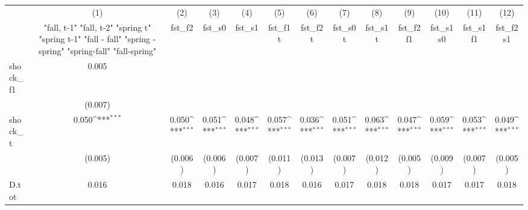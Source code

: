 {
\def\sym#1{\ifmmode^{#1}\else\(^{#1}\)\fi}
\begin{tabular}{l*{12}{c}}
\toprule
            &\multicolumn{1}{c}{(1)}&\multicolumn{1}{c}{(2)}&\multicolumn{1}{c}{(3)}&\multicolumn{1}{c}{(4)}&\multicolumn{1}{c}{(5)}&\multicolumn{1}{c}{(6)}&\multicolumn{1}{c}{(7)}&\multicolumn{1}{c}{(8)}&\multicolumn{1}{c}{(9)}&\multicolumn{1}{c}{(10)}&\multicolumn{1}{c}{(11)}&\multicolumn{1}{c}{(12)}\\
            &\multicolumn{1}{c}{  "fall, t-1" "fall, t-2" "spring t" "spring t-1"  "fall - fall" "spring - spring" "spring-fall" "fall-spring" }&\multicolumn{1}{c}{fst\_f2}&\multicolumn{1}{c}{fst\_s0}&\multicolumn{1}{c}{fst\_s1}&\multicolumn{1}{c}{fst\_f1t}&\multicolumn{1}{c}{fst\_f2t}&\multicolumn{1}{c}{fst\_s0t}&\multicolumn{1}{c}{fst\_s1t}&\multicolumn{1}{c}{fst\_f2f1}&\multicolumn{1}{c}{fst\_s1s0}&\multicolumn{1}{c}{fst\_s1f1}&\multicolumn{1}{c}{fst\_f2s1}\\
\midrule
shock\_f1    &       0.005         &                     &                     &                     &                     &                     &                     &                     &                     &                     &                     &                     \\
            &     (0.007)         &                     &                     &                     &                     &                     &                     &                     &                     &                     &                     &                     \\
\addlinespace
shock\_t     &       0.050\sym{***}&       0.050\sym{***}&       0.051\sym{***}&       0.048\sym{***}&       0.057\sym{***}&       0.036\sym{***}&       0.051\sym{***}&       0.063\sym{***}&       0.047\sym{***}&       0.059\sym{***}&       0.053\sym{***}&       0.049\sym{***}\\
            &     (0.005)         &     (0.006)         &     (0.006)         &     (0.007)         &     (0.011)         &     (0.013)         &     (0.007)         &     (0.012)         &     (0.005)         &     (0.009)         &     (0.007)         &     (0.005)         \\
\addlinespace
D.tot       &       0.016         &       0.018         &       0.016         &       0.017         &       0.018         &       0.016         &       0.017         &       0.018         &       0.018         &       0.017         &       0.017         &       0.018         \\

\end{tabular}}

